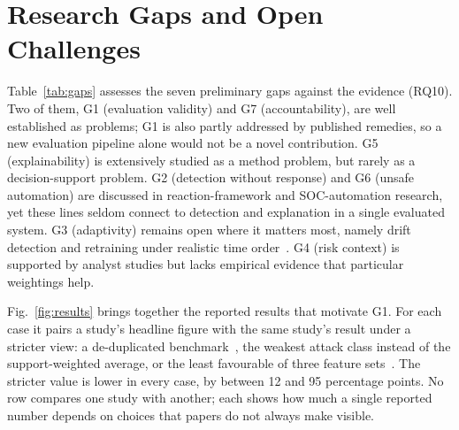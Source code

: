 \documentclass[conference]{IEEEtran}
\begin{document}
\section{Research Gaps and Open Challenges}
Table~\ref{tab:gaps} assesses the seven preliminary gaps against the evidence (RQ10). Two of them, G1 (evaluation validity) and G7 (accountability), are well established as problems; G1 is also partly addressed by published remedies, so a new evaluation pipeline alone would not be a novel contribution. G5 (explainability) is extensively studied as a method problem, but rarely as a decision-support problem. G2 (detection without response) and G6 (unsafe automation) are discussed in reaction-framework and SOC-automation research, yet these lines seldom connect to detection and explanation in a single evaluated system. G3 (adaptivity) remains open where it matters most, namely drift detection and retraining under realistic time order~\cite{pendlebury2019tesseract}. G4 (risk context) is supported by analyst studies but lacks empirical evidence that particular weightings help.

Fig.~\ref{fig:results} brings together the reported results that motivate G1. For each case it pairs a study's headline figure with the same study's result under a stricter view: a de-duplicated benchmark~\cite{shone2018deep,tavallaee2009detailed}, the weakest attack class instead of the support-weighted average, or the least favourable of three feature sets~\cite{sarhan2022standard}. The stricter value is lower in every case, by between 12 and 95 percentage points. No row compares one study with another; each shows how much a single reported number depends on choices that papers do not always make visible.
\end{document}
